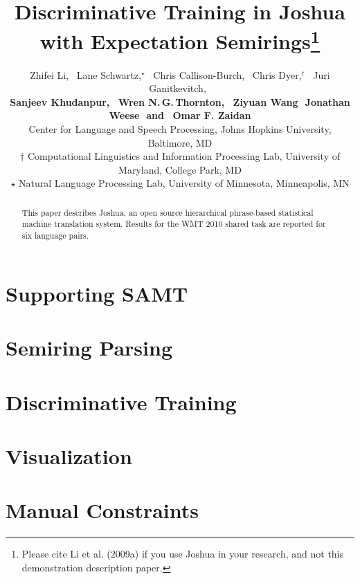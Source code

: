\documentclass[11pt]{article}
\title{Discriminative Training in Joshua with Expectation Semirings\thanks{ 
Please cite Li et al. (2009a) if you use Joshua in your research, and not this demonstration description paper. }}
\author{
Zhifei Li,\,\,\,
 Lane Schwartz,$^\star$\,\,\,
Chris Callison-Burch,\,\,\,
Chris Dyer,$^\dagger$\,\,\,
Juri Ganitkevitch,\,\,\, \\
{\bf Sanjeev Khudanpur,\,\,\, 
Wren N.\,G.\,Thornton,\,\,\,
Ziyuan Wang\,\,
Jonathan Weese\,\,
{\textnormal{and}}
\,\,\,Omar F. Zaidan}\\
Center for Language and Speech Processing, Johns Hopkins University, Baltimore, MD\\
$\dagger$ Computational Linguistics and Information Processing Lab, University of Maryland, College Park, MD\\
$\star$ Natural Language Processing Lab, University of Minnesota, Minneapolis, MN }
\date{}
\begin{document}
\maketitle

\begin{abstract}
 This paper describes Joshua, an open source hierarchical phrase-based statistical machine translation system. Results for the WMT 2010 shared task are reported for six language pairs.
\end{abstract}

\listoftodos

\section{Supporting SAMT}

\section{Semiring Parsing}

\section{Discriminative Training}

\section{Visualization}

\section{Manual Constraints}
\end{document}
